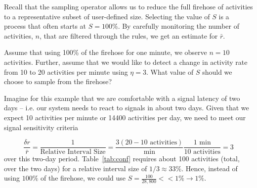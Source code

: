 \documentclass{article}
\begin{document}
Recall that the sampling operator allows us to reduce the full firehose of activities to a representative 
subset of user-defined size. Selecting the value of $S$ is a process that often starts at $S =100\%$.  
By carefully monitoring the number of activities, $n$, that are filtered through the rules, we get an 
estimate for $\bar{r}$.

Assume that using 100\% of the firehose for one minute, we observe $n = 10$ activities. Further, assume 
that we would like to detect a change in activity rate from 10 to 20 activities per minute using 
$\eta = 3$. What value of $S$ should we choose to sample from the firehose?

Imagine for this example that we are comfortable with a signal latency of two days -- i.e. our system 
needs to react to signals in about two days. Given that we expect 10 activities per minute or 
14400 activities per day, we need to meet our signal sensitivity criteria

\begin{equation}
\label{eq:ex1:criteria}
\frac{\delta r}{\bar{r}} = \frac{1}{\text{Relative Interval Size}} = 
	\frac{3(20-10 \text{ activities})}{\text{min}} \frac{1 \text{ min}}{10 \text{ activities}} = 3 
\end{equation}
over this two-day period. Table~\ref{tab:conf} requires about 100 activities (total, over the two days) 
for a relative interval size of $1/3 \approx 33\%$. Hence, instead of using $100\%$ of the 
firehose, we could use $S = \frac{100}{28,800} << 1\% \rightarrow 1\%$.


%
%
%
\end{document}
